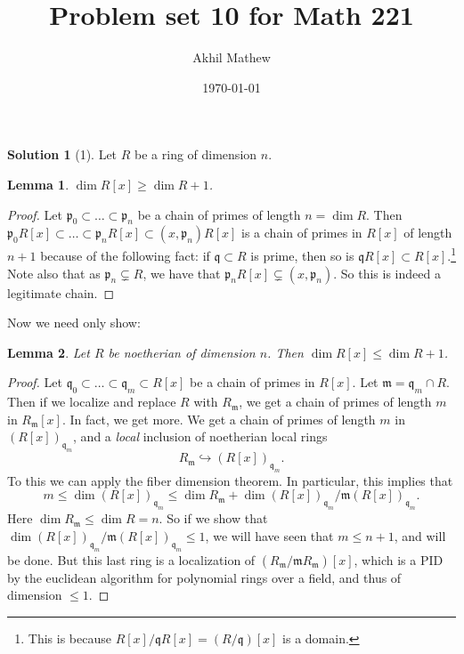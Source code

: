 \documentclass{article}
\newtheorem{lemma}{Lemma}
\theoremstyle{definition}
\newtheorem*{solution}{Solution}
\begin{document}
\title{Problem set 10 for Math 221}
\author{Akhil Mathew}
\date{\today}

\maketitle

\begin{solution}[1] 
Let $R$ be a ring of dimension $n$. 

\begin{lemma} 
$\dim R[x] \geq \dim R+1$.
\end{lemma} 
\begin{proof} 
Let $\mathfrak{p}_0 \subset \dots \subset \mathfrak{p}_n$ be a chain of primes of
length $n = \dim R$. Then $\mathfrak{p}_0 R[x] \subset \dots \subset
\mathfrak{p}_n R[x] \subset (x, \mathfrak{p}_n)R[x]$ is a chain of primes in
$R[x]$ of length $n+1$ because of the following fact: if $\mathfrak{q} \subset
R$ is prime, then so is $\mathfrak{q}R[x] \subset R[x]$.\footnote{This is
because $R[x]/\mathfrak{q}R[x] = (R/\mathfrak{q})[x]$ is a domain.} Note also
that as $\mathfrak{p}_n \subsetneq R$, we have that $\mathfrak{p}_n R[x]
\subsetneq (x, \mathfrak{p}_n)$. So this is indeed a legitimate chain. 
\end{proof} 

Now we need only show:
\begin{lemma} 
Let $R$ be noetherian of dimension $n$. Then $\dim R[x] \leq \dim R+1$.
\end{lemma} 
\begin{proof} 
Let $\mathfrak{q}_0 \subset \dots \subset \mathfrak{q}_m \subset R[x]$ be a chain of primes
in $R[x]$. Let $\mathfrak{m} = \mathfrak{q}_m \cap R$. Then if we localize and
replace $R$ with $R_{\mathfrak{m}}$, we get a chain of primes of length $m$ in
$R_{\mathfrak{m}}[x]$. 
In fact, we get more. We get a chain of primes of length $m$ in
$(R[x])_{\mathfrak{q}_m}$, and a \emph{local } inclusion of noetherian local rings
\[ R_{\mathfrak{m}} \hookrightarrow (R[x])_{\mathfrak{q}_m} . \]
To this we can apply the fiber dimension theorem. In particular, this implies
that
\[ m \leq \dim (R[x])_{\mathfrak{q}_m} \leq \dim R_{\mathfrak{m}} + \dim
(R[x])_{\mathfrak{q}_m} /\mathfrak{m} (R[x])_{\mathfrak{q}_m}. \]
Here $\dim R_{\mathfrak{m}} \leq \dim R = n$. So if we show that $\dim
(R[x])_{\mathfrak{q}_m} /\mathfrak{m} (R[x])_{\mathfrak{q}_m} \leq 1$, we will
have seen that $m \leq n+1$, and will be done. But this last ring is a
localization of $(R_{\mathfrak{m}}/\mathfrak{m}R_{\mathfrak{m}})[x]$, which is
a PID by the euclidean algorithm for polynomial rings over a field, and thus of
dimension  $\leq 1$.
\end{proof} 
\end{solution}
\end{document}
